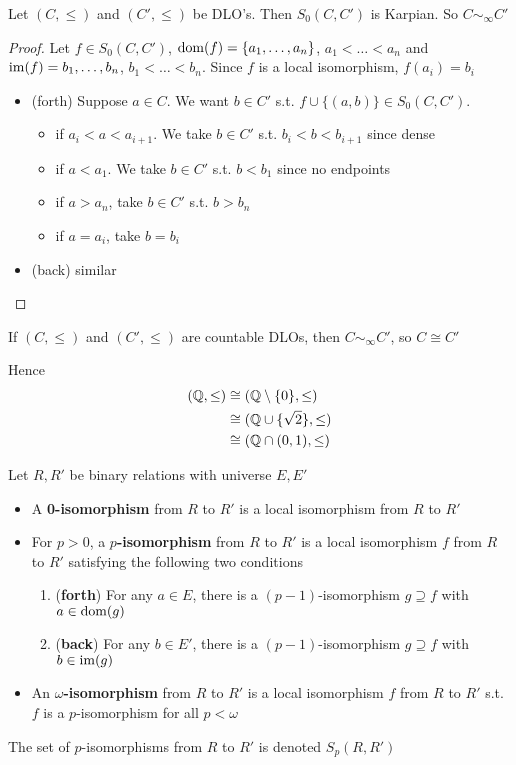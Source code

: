 \documentclass[11pt]{article}
\begin{document}
\begin{proposition}[]
Let \((C,\le)\) and \((C',\le)\) be DLO's. Then \(S_0(C,C')\) is Karpian. So \(C\sim_\infty C'\)
\end{proposition}

\begin{proof}
Let \(f\in S_0(C,C')\), \(\operatorname{dom}(f)=\{a_1,\dots,a_n\}\), \(a_1<\dots<a_n\)
and \(\operatorname{im}(f)=b_1,\dots,b_n\), \(b_1<\dots<b_n\). Since \(f\) is a local isomorphism, \(f(a_i)=b_i\)
\begin{itemize}
\item (forth) Suppose \(a\in C\). We want \(b\in C'\) s.t. \(f\cup\{(a,b)\}\in S_0(C,C')\).
\begin{itemize}
\item if \(a_i<a<a_{i+1}\). We take \(b\in C'\) s.t. \(b_i<b<b_{i+1}\) since dense
\item if \(a<a_1\). We take \(b\in C'\) s.t. \(b<b_1\) since no endpoints
\item if \(a>a_n\), take \(b\in C'\) s.t. \(b>b_n\)
\item if \(a=a_i\), take \(b=b_i\)
\end{itemize}
\item (back) similar
\end{itemize}
\end{proof}

\begin{proposition}[]
If \((C,\le)\) and \((C',\le)\) are countable DLOs, then \(C\sim_\infty C'\), so \(C\cong C'\)
\end{proposition}
Hence
\begin{align*}
(\mathbb{Q},\le)&\cong(\mathbb{Q}\setminus\{0\},\le)\\
&\cong(\mathbb{Q}\cup\{\sqrt{2}\},\le)\\
&\cong(\mathbb{Q}\cap(0,1),\le)
\end{align*}
\begin{definition}[]
Let \(R,R'\) be binary relations with universe \(E,E'\)
\begin{itemize}
\item A \textbf{0-isomorphism} from \(R\) to \(R'\) is a local isomorphism from \(R\) to \(R'\)
\item For \(p>0\), a \textbf{\(p\)-isomorphism} from \(R\) to \(R'\) is a local isomorphism \(f\) from \(R\)
to \(R'\) satisfying the following two conditions
\begin{enumerate}
\item (\textbf{forth}) For any \(a\in E\), there is a \((p-1)\)-isomorphism \(g\supseteq f\) with \(a\in\operatorname{dom}(g)\)
\item (\textbf{back}) For any \(b\in E'\), there is a \((p-1)\)-isomorphism \(g\supseteq f\) with \(b\in\operatorname{im}(g)\)
\end{enumerate}
\item An \textbf{\(\omega\)-isomorphism} from \(R\) to \(R'\) is a local isomorphism \(f\) from \(R\) to \(R'\)
s.t. \(f\) is a \(p\)-isomorphism for all \(p<\omega\)
\end{itemize}


The set of \(p\)-isomorphisms from \(R\) to \(R'\) is denoted \(S_p(R,R')\)
\end{definition}
\end{document}
